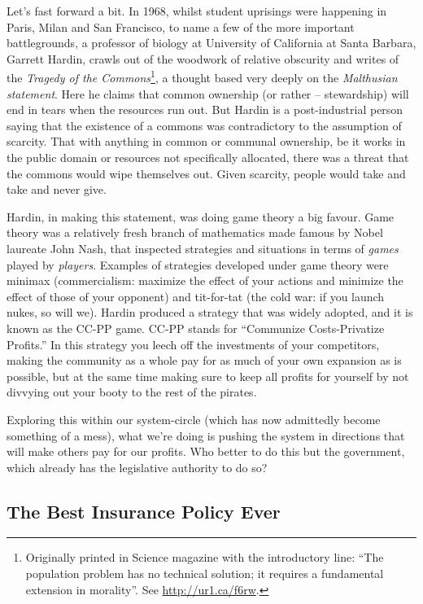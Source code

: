 Let's fast forward a bit. In 1968, whilst student uprisings were happening in
Paris, Milan and San Francisco, to name a few of the more important
battlegrounds, a professor of biology at University of California at Santa
Barbara, Garrett Hardin, crawls out of the woodwork of relative obscurity and
writes of the \textit{Tragedy of the Commons}\footnote{Originally printed in
Science magazine with the introductory line: ``The population problem has no
technical solution; it requires a fundamental extension in morality''. See
\url{http://ur1.ca/f6rw}.}, a thought based very deeply on the
\textit{Malthusian statement}. Here he claims that common ownership (or 
rather – stewardship) will end in tears when the resources run out. But Hardin
is a post-industrial person saying that the existence of a commons was
contradictory to the assumption of scarcity. That with anything in common or
communal ownership, be it works in the public domain or resources not
specif\hbox{}ically allocated, there was a threat that the commons would wipe
themselves out. Given scarcity, people would take and take and never give.

Hardin, in making this statement, was doing game theory a big favour. Game
theory was a relatively fresh branch of mathematics made famous by Nobel
laureate John Nash, that inspected strategies and situations in terms of
\textit{games} played by \textit{players}. Examples of strategies developed
under game theory were minimax (commercialism: maximize the ef\hbox{}fect of
your actions and minimize the ef\hbox{}fect of those of your opponent) and
tit-for-tat (the cold war: if you launch nukes, so will we). Hardin produced a
strategy that was widely adopted, and it is known as the CC-PP game. CC-PP
stands for “Communize Costs-Privatize Prof\hbox{}its.” In this strategy you
leech of\hbox{}f the investments of your competitors, making the community as a
whole pay for as much of your own expansion as is possible, but at the same 
time making sure to keep all prof\hbox{}its for yourself by not divvying out
your booty to the rest of the pirates.

Exploring this within our system-circle (which has now admittedly become
something of a mess), what we're doing is pushing the system in directions that
will make others pay for our prof\hbox{}its. Who better to do this but the
government, which already has the legislative authority to do so?


\subsection{The Best Insurance Policy Ever}
\label{s:artificial_scarcity:unspoken_mythology:insurance_policy}

